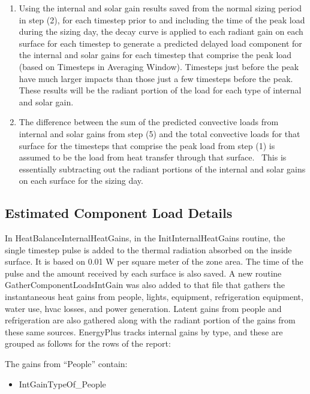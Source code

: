 \begin{enumerate}
\def\labelenumi{\arabic{enumi})}
\setcounter{enumi}{4}
\item
  Using the internal and solar gain results saved from the normal sizing period in step (2), for each timestep prior to and including the time of the peak load during the sizing day, the decay curve is applied to each radiant gain on each surface for each timestep to generate a predicted delayed load component for the internal and solar gains for each timestep that comprise the peak load (based on Timesteps in Averaging Window). Timesteps just before the peak have much larger impacts than those just a few timesteps before the peak.~ These results will be the radiant portion of the load for each type of internal and solar gain.
\item
  The difference between the sum of the predicted convective loads from internal and solar gains from step (5) and the total convective loads for that surface for the timesteps that comprise the peak load from step (1) is assumed to be the load from heat transfer through that surface.~ This is essentially subtracting out the radiant portions of the internal and solar gains on each surface for the sizing day.
\end{enumerate}

\subsection{Estimated Component Load Details}\label{estimated-component-load-details}

In HeatBalanceInternalHeatGains, in the InitInternalHeatGains routine, the single timestep pulse is added to the thermal radiation absorbed on the inside surface. It is based on 0.01 W per square meter of the zone area. The time of the pulse and the amount received by each surface is also saved. A new routine GatherComponentLoadsIntGain was also added to that file that gathers the instantaneous heat gains from people, lights, equipment, refrigeration equipment, water use, hvac losses, and power generation. Latent gains from people and refrigeration are also gathered along with the radiant portion of the gains from these same sources. EnergyPlus tracks internal gains by type, and these are grouped as follows for the rows of the report:

The gains from ``People'' contain:

\begin{itemize}
\tightlist
\item
  IntGainTypeOf\_People
\end{itemize}

